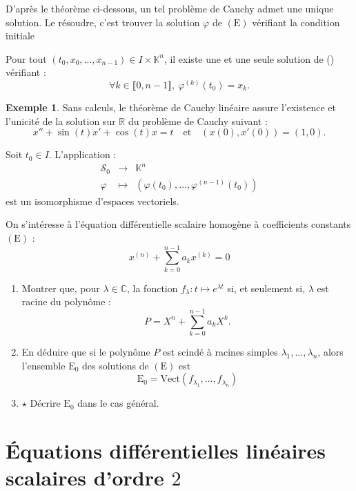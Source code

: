 \documentclass[french]{article}
\newcommand{\R}{\mathbb{R}}
\newcommand{\C}{\mathbb{C}}
\newcommand{\K}{\mathbb{K}}
\theoremstyle{plain}
\theoremstyle{definition}
\newtheorem*{ex}{Exemple}
\theoremstyle{remark}
\begin{document}
D'après le théorème ci-dessous, un tel problème de Cauchy admet une unique solution. Le résoudre, c'est trouver la solution $\varphi$ de $(\text{E})$ vérifiant la condition initiale

\begin{thm}%
	Pour tout $(t_0,x_0,\ldots,x_{n-1})\in I\times\K^n$, il existe une et une seule solution de () vérifiant :
	$$\forall k\in\llbracket0,n-1\rrbracket,\ \varphi^{(k)}(t_0)=x_k.$$
\end{thm}

\begin{ex}
	Sans calculs, le théorème de Cauchy linéaire assure l'existence et l'unicité de la solution sur $\R$ du problème de Cauchy suivant :
	$$x''+\sin(t)x'+\cos(t)x=t\quad\text{et}\quad (x(0),x'(0))=(1,0).$$
\end{ex}

\begin{cor}%
	Soit $t_0\in I$. L'application :
	$$\begin{array}{rcl}
		\mathcal{S}_0&\longrightarrow&\K^n\\
		\varphi&\longmapsto&(\varphi(t_0),\ldots,\varphi^{(n-1)}(t_0))
	\end{array}$$ est un isomorphisme d'espaces vectoriels.
\end{cor}

\begin{exo}
	On s'intéresse à l'équation différentielle scalaire homogène à coefficients constants $(\text{E})$ : $$x^{(n)}+\sum_{k=0}^{n-1}a_kx^{(k)}=0$$
	\begin{enumerate}
		\item Montrer que, pour $\lambda\in\C$, la fonction $f_\lambda :t\mapsto e^{\lambda t}$ si, et seulement si, $\lambda$ est racine du polynôme : $$P=X^n+\sum_{k=0}^{n-1}a_kX^k.$$
		\item En déduire que si le polynôme $P$ est scindé à racines simples $\lambda_1,\ldots,\lambda_n$, alors l'ensemble $\text{E}_0$ des solutions de $(\text{E})$ est $$\text{E}_0=\text{Vect}(f_{\lambda_1},\ldots,f_{\lambda_n})$$
		\item $\star$ Décrire $\text{E}_0$ dans le cas général.
	\end{enumerate}
\end{exo}

\section{Équations différentielles linéaires scalaires d'ordre $2$}
\end{document}
